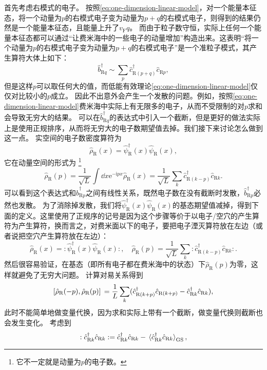 \documentclass[hyperref, UTF8, a4paper]{ctexart}
\newcommand*{\ii}{\mathrm{i}}
\newcommand*{\ee}{\mathrm{e}}
\newcommand*{\normalorder}[1]{: #1 :}
\begin{document}
首先考虑右模式的电子。
按照\eqref{eq:one-dimension-linear-model}，对一个能量本征态，将一个动量为$p$的右模式电子变为动量为$p+q$的右模式电子，则得到的结果仍然是一个能量本征态，且能量上升了$v_\text{F} q$。
而由于粒子数守恒，实际上任何一个能量本征态都可以通过“让费米海中的一些电子的动量增加”构造出来。这表明“将一个动量为$p$的右模式电子变为动量为$p+q$的右模式电子”是一个准粒子模式，其产生算符大体上如下：
\[
    \hat{b}_{\text{R} q}^\dagger \sim \sum_p \hat{c}^\dagger_{\text{R} (p+q)} \hat{c}_{\text{R} p} ,
\]
但是这样$p$可以取任何大的值，而低能有效理论\eqref{eq:one-dimension-linear-model}仅仅对比较小的$p$成立。
因此不出意外会产生一个发散的问题。例如，按照\eqref{eq:one-dimension-linear-model}费米海中实际上有无限多的电子，从而不受限制的对$p$求和会导致无穷大的结果。
可以在$\hat{b}_{\text{R} q}^\dagger$的表达式中引入一个截断，但是更好的做法实际上是使用正规排序，从而将无穷大的电子数期望值去掉。我们接下来讨论怎么做到这一点。
实空间的电子数密度算符为
\[
    \hat{\rho}_\text{R}(x) = \hat{\psi}_\text{R}^\dagger(x) \hat{\psi}_\text{R}(x),
\]
它在动量空间的形式为%
\footnote{它不一定就是动量为$p$的电子数。}%
\[
    \hat{\rho}_\text{R}(p) = \frac{1}{\sqrt{L}} \int \dd{x} \ee^{-\ii p x} \hat{\rho}_\text{R}(x) = \frac{1}{\sqrt{L}} \sum_k \hat{c}^\dagger_{\text{R} (k - p)} \hat{c}_{\text{R} k}.
\]
可以看到这个表达式和$\hat{b}^\dagger_{\text{R} p}$之间有线性关系，既然电子数在没有截断时发散，$\hat{b}^\dagger_{\text{R} p}$必然也发散。
为了消除掉发散，我们将$\hat{\psi}_\text{R}^\dagger(x) \hat{\psi}_\text{R}(x)$的基态期望值减掉，得到下面的定义。这里使用了正规序的记号是因为这个步骤等价于以电子/空穴的产生算符为产生算符，换而言之，对费米面以下的电子，要把电子湮灭算符放在左边（或者说把空穴产生算符放在左边）：
\begin{equation}
    \hat{\rho}_\text{R}(x) = \normalorder{\hat{\psi}_\text{R}^\dagger(x) \hat{\psi}_\text{R}(x)}, \quad \hat{\rho}_\text{R}(p) = \frac{1}{\sqrt{L}} \sum_k \normalorder{\hat{c}^\dagger_{\text{R} (k - p)} \hat{c}_{\text{R} k}}.
\end{equation}
然后很容易验证，在基态（即所有电子都在费米海中的状态）下$\hat{\rho}_\text{R}(p)$为零，这样就避免了无穷大问题。
计算对易关系得到
\[
    \comm*{\hat{\rho}_\text{R}(- p)}{\hat{\rho}_\text{R}(p)} = \frac{1}{L} \sum_{k} (\hat{c}^\dagger_{\text{R} (k + p)} \hat{c}_{\text{R} (k + p)} - \hat{c}^\dagger_{\text{R} k} \hat{c}_{\text{R} k}),
\]
此时不能简单地做变量代换，因为求和实际上带有一个截断，做变量代换则截断也会发生变化。
考虑到
\[
    \normalorder{\hat{c}^\dagger_{\text{R} k} \hat{c}_{\text{R} k}} = \hat{c}^\dagger_{\text{R} k} \hat{c}_{\text{R} k} - \expval*{\hat{c}^\dagger_{\text{R} k} \hat{c}_{\text{R} k}}_\text{GS},
\]
\end{document}
